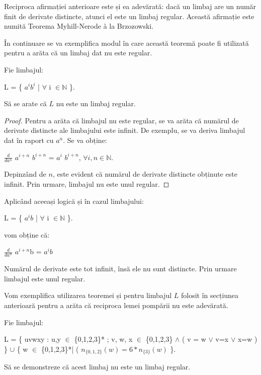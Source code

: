 Reciproca afirmației anterioare este și ea adevărată: dacă un limbaj are un număr finit de derivate distincte, atunci el este un limbaj regular. Această afirmație este numită Teorema Myhill-Nerode à la Brzozowski.

În continuare se va exemplifica modul în care această teoremă poate fi utilizată pentru a arăta că un limbaj dat nu este regular.

Fie limbajul:

L = \{ $a^{i} b^{i}$ | $\forall$ i $\in \mathbb{N}$ \}.

Să se arate că $L$ nu este un limbaj regular.

\begin{proof}

Pentru a arăta că limbajul nu este regular, se va arăta că numărul de derivate distincte ale limbajului este infinit. De exemplu, se va deriva limbajul dat în raport cu $a^n$. Se va obține:

$\frac{d}{da^{n}}$ $a^{i+n}$ $b^{i+n}$ = $a^{i}$ $b^{i+n}$, $\forall i,n \in \mathbb{N}$.

Depinzând de $n$, este evident că numărul de derivate distincte obținute este infinit. Prin urmare, limbajul nu este unul regular.
\end{proof}

Aplicând aceeași logică și în cazul limbajului:

L = \{ $a^{i} b$ | $\forall$ i $\in \mathbb{N}$ \}.

vom obține că:
 
$\frac{d}{da^{n}}$ $a^{i+n}$b = $a^{i}b $ 

Numărul de derivate este tot infinit, însă ele nu sunt distincte. Prin urmare limbajul este unul regular.
  
Vom exemplifica utilizarea teoremei și pentru limbajul $L$ folosit în secțiunea anterioară pentru a arăta că reciproca lemei pompării nu este adevărată.

Fie limbajul:

L = \{ uvwxy : u,y $\in$ \{0,1,2,3\}* ; v, w, x $\in$ \{0,1,2,3\} $\wedge$ ( v = w $\vee$ v=x $\vee$ x=w ) \} $\cup$ \{ w $\in$ \{0,1,2,3\}*| ( $n_{\{0,1,2\}}(w) = 6*n_{\{3\}} (w)$ \}.

Să se demonstreze că acest limbaj nu este un limbaj regular.

